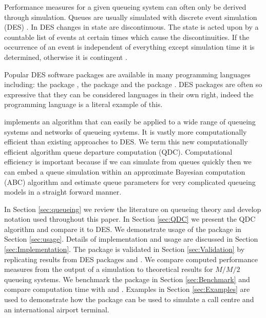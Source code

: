 \documentclass[article]{jss}
\begin{document}
Performance measures for a given queueing system can often only be derived through simulation. Queues are usually simulated with discrete event simulation (DES) \citep[pg. 226]{insua2012bayesian}. In DES changes in state are discontinuous. The state is acted upon by a countable list of events at certain times which cause the discontinuities. If the occurrence of an event is independent of everything except simulation time it is determined, otherwise it is contingent \citep{nance1981time}. 

Popular DES software packages are available in many programming languages including: the  package  \citep{Rpkg_simmer}, the  \citep{van2011python} package  \citep{Ppkg_simpy} and the   \citep{gosling2000java} package  \citep{Jpkg_JMT}. DES packages are often so expressive that they can be considered languages in their own right, indeed the programming language  \citep{dahl1966simula} is a literal example of this. 

 \citep{Rpkg_queuecomputer} implements an algorithm that can easily be applied to a wide range of queueing systems and networks of queueing systems. It is vastly more computationally efficient than existing approaches to DES. We term this new computationally efficient algorithm queue departure computation (QDC). Computational efficiency is important because if we can simulate from queues quickly then we can embed a queue simulation within an approximate Bayesian computation (ABC) algorithm \citep{sunnaker_approximate_2013} and estimate queue parameters for very complicated queueing models in a straight forward manner. 

In Section \ref{sec:queueing} we review the literature on queueing theory and develop notation used throughout this paper. In Section \ref{sec:QDC} we present the QDC algorithm and compare it to DES. We demonstrate usage of the package in Section \ref{sec:usage}. Details of implementation and usage are discussed in Section \ref{sec:Implementation}. The package is validated in Section \ref{sec:Validation} by replicating results from DES packages  and . We compare computed performance measures from the output of a  simulation to theoretical results for $M/M/2$ queueing systems. We benchmark the package in Section \ref{sec:Benchmark} and compare computation time with  and . Examples in Section \ref{sec:Examples} are used to demonstrate how the package can be used to simulate a call centre and an international airport terminal. 
\end{document}
